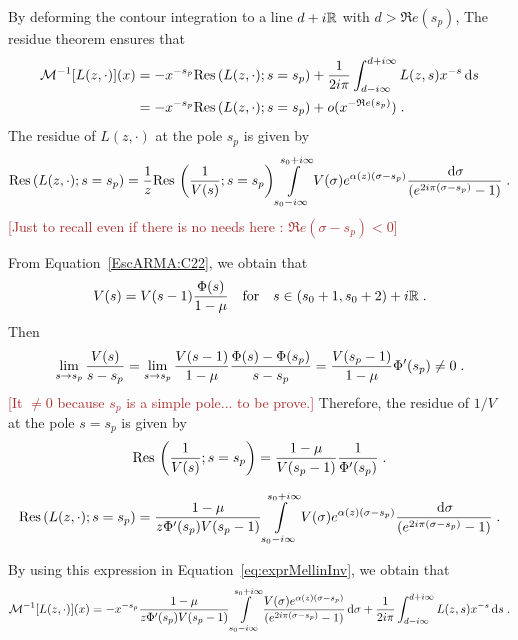\documentclass[11pt]{amsart}
\renewcommand{\Re}{\mathfrak{R}e}
\newcommand{\diff}{\,\mathrm{d}}
\newcommand{\ndr}[1]{\textcolor{brown}{[#1]}}
\newcommand{\res}{\mathrm{Res}\,}
\begin{document}
By deforming the contour integration to a line $d+i\mathbb{R}$ with $d > \Re(s_p)$, The residue theorem ensures that
\begin{subequations}
\begin{align}
    \Mcal^{-1}[L(z,\cdot)](x) 
    &= - x^{-s_p}\res(L(z,\cdot);s = s_p) +  \frac{1}{2i\pi} \int_{d-i\infty}^{d+i\infty} L(z,s)x^{-s}\diff s\\
    &= - x^{-s_p}\res(L(z,\cdot);s = s_p) + o(x^{-\Re(s_p)})
    \eqfinp
\end{align}
\label{eq:exprMellinInv}
\end{subequations}
The residue of $L(z,\cdot)$ at the pole $s_p$ is given by 
\begin{equation*}
    \res(L(z,\cdot);s = s_p) 
    = 
    \frac{1}{z}\res\left( \frac{1}{V(s)}; s = s_p\right) \int\limits_{s_0-i\infty}^{s_0+i\infty}
    V(\sigma) e^{ \alpha(z)(\sigma-s_p)}
   \frac{\diff \sigma}{(e^{2i\pi(\sigma-s_p)}-1)}
   \eqfinp
\end{equation*}
\ndr{Just to recall even if there is no needs here : $\Re(\sigma-s_p) < 0$}

From Equation~\eqref{EscARMA:C22}, we obtain that
$$ V(s) = V(s-1)\frac{\Phi(s)}{1-\mu}
        \quad \text{for} \quad
        s \in (s_0+1, s_0+2) + i\mathbb{R}
        \; .$$
Then 
$$ \lim_{s\to s_p} \frac{V(s)}{s-s_p} 
= \lim_{s\to s_p} \frac{V(s-1)}{1-\mu} \frac{\Phi(s)-\Phi(s_p)}{s-s_p}
=  \frac{V(s_p-1)}{1-\mu} \Phi'(s_p) \neq 0 \; .$$
\ndr{It $\neq 0$ because $s_p$ is a simple pole... to be prove.}
Therefore, the  residue of $1/V$ at the pole $s = s_p$ is given by 
$$ \res\left( \frac{1}{V(s)}; s = s_p\right) = \frac{1-\mu}{V(s_p-1)} \frac{1}{\Phi'(s_p)} \eqfinp$$

\begin{equation}
    \res(L(z,\cdot);s = s_p) 
    = 
     \frac{1-\mu}{z \Phi'(s_p) V(s_p-1)}
     \int\limits_{s_0-i\infty}^{s_0+i\infty}
    V(\sigma) e^{ \alpha(z)(\sigma-s_p)}
   \frac{\diff \sigma}{(e^{2i\pi(\sigma-s_p)}-1)}
   \eqfinp
\end{equation}

By using this expression in Equation~\eqref{eq:exprMellinInv}, we obtain that 
\begin{equation*}
    \Mcal^{-1}[L(z,\cdot)](x) 
    = - x^{-s_p}\frac{1-\mu}{z \Phi'(s_p) V(s_p-1)}
     \int\limits_{s_0-i\infty}^{s_0+i\infty}
     \frac{V(\sigma) e^{ \alpha(z)(\sigma-s_p)}
  }{(e^{2i\pi(\sigma-s_p)}-1)}\diff \sigma + \frac{1}{2i\pi} \int_{d-i\infty}^{d+i\infty} L(z,s)x^{-s}\diff s
    \eqfinp
\end{equation*}
\end{document}
